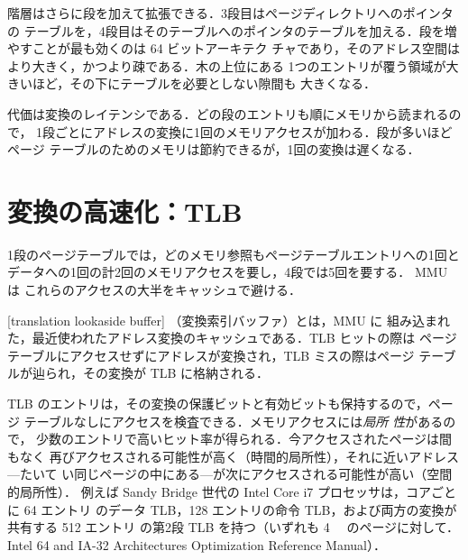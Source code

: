 \documentclass[../main.tex]{subfiles}
\begin{document}
階層はさらに段を加えて拡張できる．3段目はページディレクトリへのポインタの
テーブルを，4段目はそのテーブルへのポインタのテーブルを加える．段を増やすことが最も効くのは 64 ビットアーキテク
チャであり，そのアドレス空間はより大きく，かつより疎である．木の上位にある
1つのエントリが覆う領域が大きいほど，その下にテーブルを必要としない隙間も
大きくなる．

代価は変換のレイテンシである．どの段のエントリも順にメモリから読まれるので，
1段ごとにアドレスの変換に1回のメモリアクセスが加わる．段が多いほどページ
テーブルのためのメモリは節約できるが，1回の変換は遅くなる．

\section{変換の高速化：TLB}
\label{sec:l08-tlb}

1段のページテーブルでは，どのメモリ参照もページテーブルエントリへの1回と
データへの1回の計2回のメモリアクセスを要し，4段では5回を要する．
MMU は
これらのアクセスの大半をキャッシュで避ける．

\begin{definition}[変換索引バッファ]
  [translation lookaside buffer]%
  （変換索引バッファ）とは，MMU に
  組み込まれた，最近使われたアドレス変換のキャッシュである．TLB ヒットの際は
  ページテーブルにアクセスせずにアドレスが変換され，TLB ミスの際はページ
  テーブルが辿られ，その変換が TLB に格納される．
\end{definition}

TLB のエントリは，その変換の保護ビットと有効ビットも保持するので，ページ
テーブルなしにアクセスを検査できる．メモリアクセスには\emph{局所
性}があるので，
少数のエントリで高いヒット率が得られる．今アクセスされたページは間もなく
再びアクセスされる可能性が高く（時間的局所性），それに近いアドレス---たいて
い同じページの中にある---が次にアクセスされる可能性が高い（空間的局所性）．
例えば Sandy Bridge 世代の Intel Core i7 プロセッサは，コアごとに 64 エントリ
のデータ TLB，128 エントリの命令 TLB，および両方の変換が共有する 512 エントリ
の第2段 TLB を持つ（いずれも \SI{4}{\kibi\byte} のページに対して．Intel 64
and IA-32 Architectures Optimization Reference Manual）．
\end{document}

